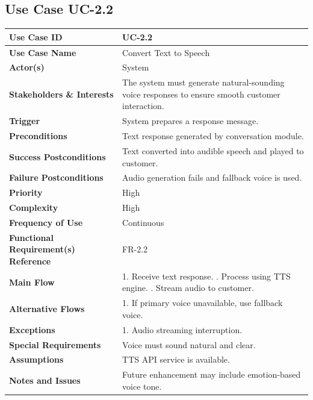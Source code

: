 \documentclass[12pt,a4paper]{report}
\begin{document}
\subsection*{Use Case UC-2.2}
\begin{longtable}{|p{4cm}|p{9cm}|}
\hline
\textbf{Use Case ID} & UC-2.2 \\ \hline
\textbf{Use Case Name} & Convert Text to Speech \\ \hline
\textbf{Actor(s)} & System \\ \hline
\textbf{Stakeholders \& Interests} & The system must generate natural-sounding voice responses to ensure smooth customer interaction. \\ \hline
\textbf{Trigger} & System prepares a response message. \\ \hline
\textbf{Preconditions} & Text response generated by conversation module. \\ \hline
\textbf{Success Postconditions} & Text converted into audible speech and played to customer. \\ \hline
\textbf{Failure Postconditions} & Audio generation fails and fallback voice is used. \\ \hline
\textbf{Priority} & High \\ \hline
\textbf{Complexity} & High \\ \hline
\textbf{Frequency of Use} & Continuous \\ \hline
\textbf{Functional Requirement(s) Reference} & FR-2.2 \\ \hline
\textbf{Main Flow} &
1. Receive text response. \newline
2. Process using TTS engine. \newline
3. Stream audio to customer. \\ \hline
\textbf{Alternative Flows} &
1. If primary voice unavailable, use fallback voice. \\ \hline
\textbf{Exceptions} &
1. Audio streaming interruption. \\ \hline
\textbf{Special Requirements} &
Voice must sound natural and clear. \\ \hline
\textbf{Assumptions} &
TTS API service is available. \\ \hline
\textbf{Notes and Issues} &
Future enhancement may include emotion-based voice tone. \\ \hline
\end{longtable}

\end{document}

